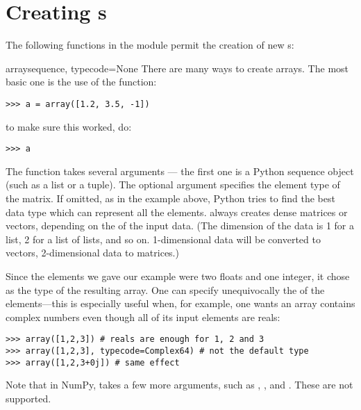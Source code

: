\section{Creating s}

The following functions in the module  permit
the creation of new s:

\begin{funcdesc}{array}{sequence, typecode=None}
   There are many ways to create arrays. The most basic one is the use of the
    function:
\begin{verbatim}
>>> a = array([1.2, 3.5, -1])
\end{verbatim}
   to make sure this worked, do:
\begin{verbatim}
>>> a
\end{verbatim}
   The  function takes several arguments --- the first
   one is a Python sequence object (such as a list or a tuple).  The
   optional argument  specifies the element type of the
   matrix. If omitted, as in the example above, Python tries to find
   the best data type which can represent all the
   elements.  always creates dense matrices or
   vectors, depending on the  of
   the input data.  (The dimension of the data is 1 for a list, 2 for
   a list of lists, and so on.  1-dimensional data will be converted
   to vectors, 2-dimensional data to matrices.)
   
   Since the elements we gave our example were two floats and one integer, it
   chose  as the type of the resulting array. One can specify
   unequivocally the  of the elements---this is especially 
   useful when, for example, one wants an array contains complex numbers even
   though all of its input elements are reals:
\begin{verbatim}
>>> array([1,2,3]) # reals are enough for 1, 2 and 3
>>> array([1,2,3], typecode=Complex64) # not the default type
>>> array([1,2,3+0j]) # same effect
\end{verbatim}
    Note that in NumPy,  takes a few more arguments, such as
    , , and . These are not supported.
\end{funcdesc}

